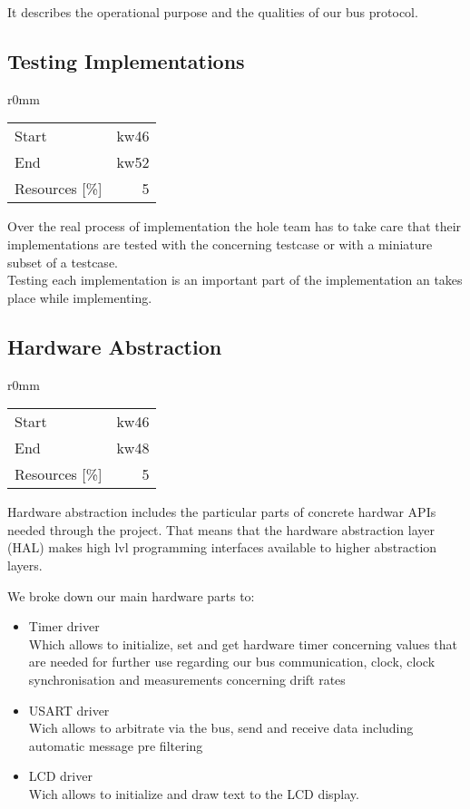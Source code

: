 It describes the operational purpose and the qualities of our bus protocol.
\subsection{Testing Implementations}
\begin{wrapfigure}{r}{0mm}
\begin{tabular}[t]{|lr|}
\hline
Start & kw46\\
End & kw52\\
Resources [\%] & 5\\
\hline
\end{tabular}
\end{wrapfigure}
Over the real process of implementation the hole team has to take care that their 
implementations are tested with the concerning testcase or with a miniature subset of a testcase.\\

Testing each implementation is an important part of the implementation an takes place while
implementing.
\subsection{Hardware Abstraction}
\begin{wrapfigure}{r}{0mm}
\begin{tabular}[t]{|lr|}
\hline
Start & kw46\\
End & kw48\\
Resources [\%] & 5\\
\hline
\end{tabular}
\end{wrapfigure}
Hardware abstraction includes the particular parts of concrete hardwar APIs needed through the project. 
That means that the hardware abstraction layer (HAL) makes high lvl programming interfaces available to 
higher abstraction layers.

We broke down our main hardware parts to:
\begin{itemize}
 \item Timer driver\\
Which allows to initialize, set and get hardware timer concerning values that are needed
for further use regarding our bus communication, clock, clock synchronisation and 
measurements concerning drift rates
 \item USART driver\\
Wich allows to arbitrate via the bus, send and receive data including automatic message 
pre filtering
 \item LCD driver\\
Wich allows to initialize and draw text to the LCD display.
\end{itemize}

